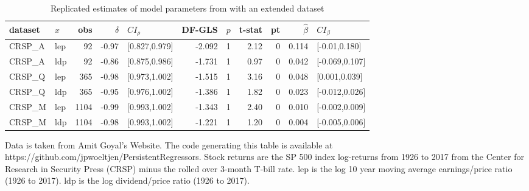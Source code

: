 \documentclass{article}
\begin{document}
\begin{table}[h!]
\small
\setlength\tabcolsep{5.3pt}
\centering
\caption{Replicated estimates of model parameters from \citet{campbell2006efficient} with an extended dataset}
\label{tab:extended}
\begin{threeparttable}
\begin{tabular}{llrrlrrrrrl}
  \hline
dataset & $x$ & obs & $\hat{\delta}$ & $CI_{\rho}$ & DF-GLS & $p$ &t-stat & pt & $\hat{\beta}$ & $CI_{\beta}$ \\ 
  \hline
    CRSP\_A  & lep & 92 & -0.97 & [0.827,0.979] & -2.092 & 1 & 2.12 & 0 & 0.114 & [-0.01,0.180] \\ 
    CRSP\_A  & ldp & 92 & -0.86 & [0.875,0.986] & -1.731 & 1 & 0.97 & 0 & 0.042 & [-0.069,0.107] \\ 
   CRSP\_Q & lep & 365 & -0.98 & [0.973,1.002] & -1.515 & 1 & 3.16 & 0 & 0.048 & [0.001,0.039] \\ 
  CRSP\_Q & ldp & 365 & -0.95 & [0.976,1.002] & -1.386 & 1 & 1.82 & 0 & 0.023 & [-0.012,0.026] \\ 
  CRSP\_M & lep & 1104 & -0.99 & [0.993,1.002] & -1.343 & 1 & 2.40 & 0 & 0.010 & [-0.002,0.009] \\ 
  CRSP\_M & ldp & 1104 & -0.98 & [0.993,1.002] & -1.221 & 1 & 1.20 & 0 & 0.004 & [-0.005,0.006] \\ 
\hline
\end{tabular}
 \begin{tablenotes}
 \small
\item Data is taken from Amit Goyal’s Website. The code generating this table is available at https://github.com/jpwoeltjen/PersistentRegressors. Stock returns are the SP 500 index log-returns from 1926 to 2017 from the Center for Research in Security Press (CRSP) minus the rolled over 3-month T-bill rate. lep is the log 10 year moving average earnings/price ratio (1926 to 2017). ldp is the log dividend/price ratio (1926 to 2017).

\end{tablenotes}
\end{threeparttable}
\end{table}
\end{document}
